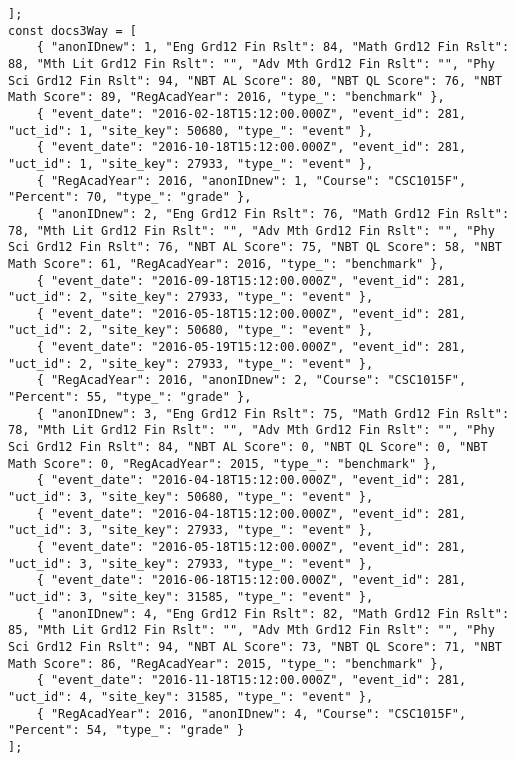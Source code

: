 \begin{verbatim}
];
const docs3Way = [
    { "anonIDnew": 1, "Eng Grd12 Fin Rslt": 84, "Math Grd12 Fin Rslt": 88, "Mth Lit Grd12 Fin Rslt": "", "Adv Mth Grd12 Fin Rslt": "", "Phy Sci Grd12 Fin Rslt": 94, "NBT AL Score": 80, "NBT QL Score": 76, "NBT Math Score": 89, "RegAcadYear": 2016, "type_": "benchmark" },
    { "event_date": "2016-02-18T15:12:00.000Z", "event_id": 281, "uct_id": 1, "site_key": 50680, "type_": "event" },
    { "event_date": "2016-10-18T15:12:00.000Z", "event_id": 281, "uct_id": 1, "site_key": 27933, "type_": "event" },
    { "RegAcadYear": 2016, "anonIDnew": 1, "Course": "CSC1015F", "Percent": 70, "type_": "grade" },
    { "anonIDnew": 2, "Eng Grd12 Fin Rslt": 76, "Math Grd12 Fin Rslt": 78, "Mth Lit Grd12 Fin Rslt": "", "Adv Mth Grd12 Fin Rslt": "", "Phy Sci Grd12 Fin Rslt": 76, "NBT AL Score": 75, "NBT QL Score": 58, "NBT Math Score": 61, "RegAcadYear": 2016, "type_": "benchmark" },
    { "event_date": "2016-09-18T15:12:00.000Z", "event_id": 281, "uct_id": 2, "site_key": 27933, "type_": "event" },
    { "event_date": "2016-05-18T15:12:00.000Z", "event_id": 281, "uct_id": 2, "site_key": 50680, "type_": "event" },
    { "event_date": "2016-05-19T15:12:00.000Z", "event_id": 281, "uct_id": 2, "site_key": 27933, "type_": "event" },
    { "RegAcadYear": 2016, "anonIDnew": 2, "Course": "CSC1015F", "Percent": 55, "type_": "grade" },
    { "anonIDnew": 3, "Eng Grd12 Fin Rslt": 75, "Math Grd12 Fin Rslt": 78, "Mth Lit Grd12 Fin Rslt": "", "Adv Mth Grd12 Fin Rslt": "", "Phy Sci Grd12 Fin Rslt": 84, "NBT AL Score": 0, "NBT QL Score": 0, "NBT Math Score": 0, "RegAcadYear": 2015, "type_": "benchmark" },
    { "event_date": "2016-04-18T15:12:00.000Z", "event_id": 281, "uct_id": 3, "site_key": 50680, "type_": "event" },
    { "event_date": "2016-04-18T15:12:00.000Z", "event_id": 281, "uct_id": 3, "site_key": 27933, "type_": "event" },
    { "event_date": "2016-05-18T15:12:00.000Z", "event_id": 281, "uct_id": 3, "site_key": 27933, "type_": "event" },
    { "event_date": "2016-06-18T15:12:00.000Z", "event_id": 281, "uct_id": 3, "site_key": 31585, "type_": "event" },
    { "anonIDnew": 4, "Eng Grd12 Fin Rslt": 82, "Math Grd12 Fin Rslt": 85, "Mth Lit Grd12 Fin Rslt": "", "Adv Mth Grd12 Fin Rslt": "", "Phy Sci Grd12 Fin Rslt": 94, "NBT AL Score": 73, "NBT QL Score": 71, "NBT Math Score": 86, "RegAcadYear": 2015, "type_": "benchmark" },
    { "event_date": "2016-11-18T15:12:00.000Z", "event_id": 281, "uct_id": 4, "site_key": 31585, "type_": "event" },
    { "RegAcadYear": 2016, "anonIDnew": 4, "Course": "CSC1015F", "Percent": 54, "type_": "grade" }
];


\end{verbatim}
